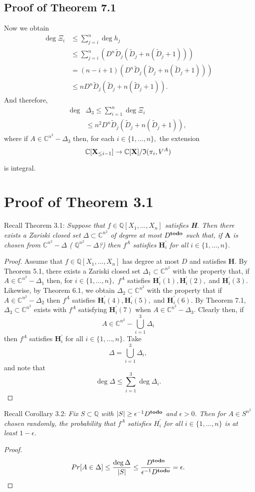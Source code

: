 \documentclass[sigconf]{acmart}
\def\td{{\bf todo}}
\def\C{\mathbb{C}}
\def\Q{\mathbb{Q}}
\def\Dt{\widetilde{D}}
\def\D{\Delta}
\begin{document}
\subsection{Proof of Theorem 7.1}
%
Now we obtain
%
\begin{align*}
    \deg \Xi_i 
    &\leq \sum_{j=i}^n \deg h_j\\
    &\leq  \sum_{j=i}^n \left( D^n\Dt_j\left(\Dt_j + n\left(\Dt_j+1\right) \right) \right) \\
    &=  (n-i+1)\left( D^n\Dt_j\left(\Dt_j + n\left(\Dt_j+1\right) \right) \right)\\
    &\leq  n D^n\Dt_j\left(\Dt_j + n\left(\Dt_j+1\right) \right) .
\end{align*}
%
And therefore,  
%
\begin{align*}
    \deg& \Delta_3 \leq \sum_{i=1}^n \deg \Xi_i\\
    &\leq n^2 D^n\Dt_j\left(\Dt_j + n\left(\Dt_j+1\right) \right),
\end{align*}
%
where if $A \in \C^{n^2} - \Delta_3$ then, for each $i \in \{1,\hdots,n\},$ the extension 
\[
\C[\textbf{X}_{\leq i-1}]\rightarrow\C[\textbf{X}]/\frak{I}(\pi_i,V^A)
\]

is integral.
%
%
%
%
\section{Proof of Theorem 3.1}
%
Recall Theorem 3.1: \textit{Suppose that $f \in \Q[X_1,\hdots,X_n]$ satisfies \textbf{H}. Then there exists a Zariski closed set $\D \subset \mathbb{C}^{n^2}$ of degree at most $D^{\textrm{\td}}$ such that, if $\textbf{A}$ is chosen from  $\C^{n^2}-\Delta$ ( $\Q^{n^2}-\Delta$?) then $f^A$ satisfies $\textbf{H}_i^{'}$ for all $i \in \{1,\hdots,n\}.$} 
%
\begin{proof}
Assume that $f\in \Q[X_1,\hdots,X_n]$ has degree at most $D$ and satisfies $\textbf{H}.$ By Theorem 5.1, there exists a Zariski closed set $\D_1\subset \C^{n^2}$ with the property that, if $A \in \C^{n^2}-\D_1$ then, for $i \in \{1,\hdots,n\},$ $f^A$ satisfies $\textbf{H}_i^{'}(1), \textbf{H}_i^{'}(2),$ and $\textbf{H}_i^{'}(3).$ Likewise, by Theorem 6.1, we obtain $\D_2 \subset \C^{n^2}$ with the property that if $A \in \C^{n^2}-\D_2$ then $f^A$ satisfies $\textbf{H}_i^{'}(4), \textbf{H}_i^{'}(5),$ and $\textbf{H}_i^{'}(6).$ By Theorem 7.1, $\D_3 \subset \C^{n^2}$ exists with $f^A$ satisfying $\textbf{H}_i^{'}(7)$ when $A \in \C^{n^2}-\D_3$. Clearly then, if 
\[
A \in \C^{n^2} - \bigcup_{i=1}^3 \D_i
\]
then $f^A$ satisfies  $\textbf{H}_i^{'}$ for all $i \in \{1,\hdots,n\}.$ Take 
\[
\Delta = \bigcup_{i=1}^3 \D_i,
\]
and note that 
\[
\deg \D \leq  \sum_{i=1}^3 \deg \D_i.
\]
\end{proof}
%
Recall Corollary 3.2: \textit{Fix $S \subset \mathbb{Q}$ with $|S| \geq \epsilon^{-1} D^{\textrm{\td}}$ and $\epsilon > 0$. Then for $A\in S^{n^2}$ chosen randomly, the probability that $f^A$ satisfies $H_i^{'}$ for all $i \in \{1,\hdots,n\}$ is at least $1-\epsilon.$}
%
\begin{proof}
\[
Pr[A \in \Delta] \leq \frac{\deg \Delta}{|S|} \leq \frac{D^{\td}}{\epsilon^{-1}D^{\td}} = \epsilon.
\]
\end{proof}
%
%
%
%
\end{document}
